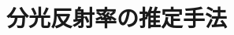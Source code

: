 \documentclass[../main]{subfiles}
\begin{document}
\section{分光反射率の推定手法}
\label{sec:pmethod_method}
\end{document}
